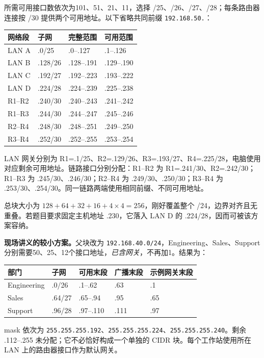 \begin{workedsolution}
所需可用接口数依次为101、51、21、11，选择 /25、/26、/27、/28；每条路由器连接按 /30 提供两个可用地址。以下省略共同前缀 \texttt{192.168.50.}：

\begin{center}
\small
\begin{tabular}{@{}llll@{}}
\toprule
网络段 & 子网 & 完整范围 & 可用范围 \\
\midrule
LAN A & .0/25 & .0--.127 & .1--.126 \\
LAN B & .128/26 & .128--.191 & .129--.190 \\
LAN C & .192/27 & .192--.223 & .193--.222 \\
LAN D & .224/28 & .224--.239 & .225--.238 \\
R1--R2 & .240/30 & .240--.243 & .241--.242 \\
R1--R3 & .244/30 & .244--.247 & .245--.246 \\
R2--R4 & .248/30 & .248--.251 & .249--.250 \\
R3--R4 & .252/30 & .252--.255 & .253--.254 \\
\bottomrule
\end{tabular}
\end{center}

LAN 网关分别为 R1=.1/25、R2=.129/26、R3=.193/27、R4=.225/28，电脑使用对应剩余可用地址。链路接口分别分配：R1--R2 为 R1=.241/30、R2=.242/30；R1--R3 为 .245/30、.246/30；R2--R4 为 .249/30、.250/30；R3--R4 为 .253/30、.254/30。同一链路两端使用相同前缀、不同可用地址。

总块大小为 $128+64+32+16+4\times4=256$，刚好覆盖整个 /24，边界对齐且无重叠。若题目要求固定主机地址 .230，它落入 LAN D 的 .224/28，因而可被该方案容纳。

\textbf{现场讲义的较小方案。}父块改为 \texttt{192.168.40.0/24}，Engineering、Sales、Support 分别需要50、25、12个接口地址，\emph{已含网关}，不再加1。结果为：
\begin{center}
\small
\begin{tabular}{@{}lllll@{}}
\toprule
部门 & 子网 & 可用末段 & 广播末段 & 示例网关末段 \\
\midrule
Engineering & .0/26 & .1--.62 & .63 & .1 \\
Sales & .64/27 & .65--.94 & .95 & .65 \\
Support & .96/28 & .97--.110 & .111 & .97 \\
\bottomrule
\end{tabular}
\end{center}
mask 依次为 \texttt{255.255.255.192}、\texttt{255.255.255.224}、\texttt{255.255.255.240}。剩余 .112--.255 未分配；它不必恰好构成一个单独的 CIDR 块。每个工作站使用所在 LAN 上的路由器接口作为默认网关。
\end{workedsolution}

